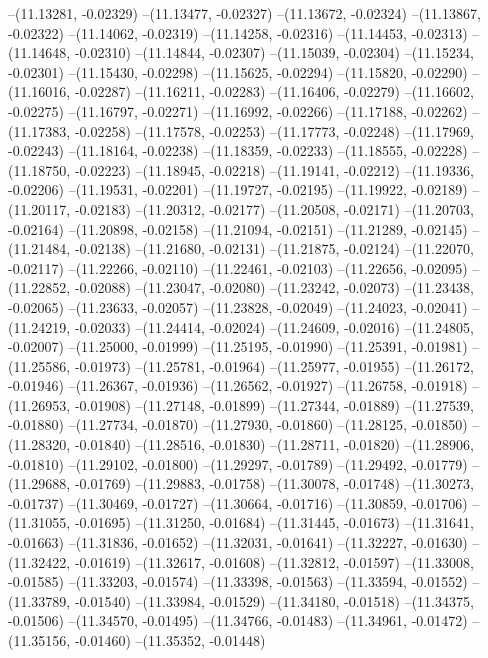 --(11.13281, -0.02329)
--(11.13477, -0.02327)
--(11.13672, -0.02324)
--(11.13867, -0.02322)
--(11.14062, -0.02319)
--(11.14258, -0.02316)
--(11.14453, -0.02313)
--(11.14648, -0.02310)
--(11.14844, -0.02307)
--(11.15039, -0.02304)
--(11.15234, -0.02301)
--(11.15430, -0.02298)
--(11.15625, -0.02294)
--(11.15820, -0.02290)
--(11.16016, -0.02287)
--(11.16211, -0.02283)
--(11.16406, -0.02279)
--(11.16602, -0.02275)
--(11.16797, -0.02271)
--(11.16992, -0.02266)
--(11.17188, -0.02262)
--(11.17383, -0.02258)
--(11.17578, -0.02253)
--(11.17773, -0.02248)
--(11.17969, -0.02243)
--(11.18164, -0.02238)
--(11.18359, -0.02233)
--(11.18555, -0.02228)
--(11.18750, -0.02223)
--(11.18945, -0.02218)
--(11.19141, -0.02212)
--(11.19336, -0.02206)
--(11.19531, -0.02201)
--(11.19727, -0.02195)
--(11.19922, -0.02189)
--(11.20117, -0.02183)
--(11.20312, -0.02177)
--(11.20508, -0.02171)
--(11.20703, -0.02164)
--(11.20898, -0.02158)
--(11.21094, -0.02151)
--(11.21289, -0.02145)
--(11.21484, -0.02138)
--(11.21680, -0.02131)
--(11.21875, -0.02124)
--(11.22070, -0.02117)
--(11.22266, -0.02110)
--(11.22461, -0.02103)
--(11.22656, -0.02095)
--(11.22852, -0.02088)
--(11.23047, -0.02080)
--(11.23242, -0.02073)
--(11.23438, -0.02065)
--(11.23633, -0.02057)
--(11.23828, -0.02049)
--(11.24023, -0.02041)
--(11.24219, -0.02033)
--(11.24414, -0.02024)
--(11.24609, -0.02016)
--(11.24805, -0.02007)
--(11.25000, -0.01999)
--(11.25195, -0.01990)
--(11.25391, -0.01981)
--(11.25586, -0.01973)
--(11.25781, -0.01964)
--(11.25977, -0.01955)
--(11.26172, -0.01946)
--(11.26367, -0.01936)
--(11.26562, -0.01927)
--(11.26758, -0.01918)
--(11.26953, -0.01908)
--(11.27148, -0.01899)
--(11.27344, -0.01889)
--(11.27539, -0.01880)
--(11.27734, -0.01870)
--(11.27930, -0.01860)
--(11.28125, -0.01850)
--(11.28320, -0.01840)
--(11.28516, -0.01830)
--(11.28711, -0.01820)
--(11.28906, -0.01810)
--(11.29102, -0.01800)
--(11.29297, -0.01789)
--(11.29492, -0.01779)
--(11.29688, -0.01769)
--(11.29883, -0.01758)
--(11.30078, -0.01748)
--(11.30273, -0.01737)
--(11.30469, -0.01727)
--(11.30664, -0.01716)
--(11.30859, -0.01706)
--(11.31055, -0.01695)
--(11.31250, -0.01684)
--(11.31445, -0.01673)
--(11.31641, -0.01663)
--(11.31836, -0.01652)
--(11.32031, -0.01641)
--(11.32227, -0.01630)
--(11.32422, -0.01619)
--(11.32617, -0.01608)
--(11.32812, -0.01597)
--(11.33008, -0.01585)
--(11.33203, -0.01574)
--(11.33398, -0.01563)
--(11.33594, -0.01552)
--(11.33789, -0.01540)
--(11.33984, -0.01529)
--(11.34180, -0.01518)
--(11.34375, -0.01506)
--(11.34570, -0.01495)
--(11.34766, -0.01483)
--(11.34961, -0.01472)
--(11.35156, -0.01460)
--(11.35352, -0.01448)
